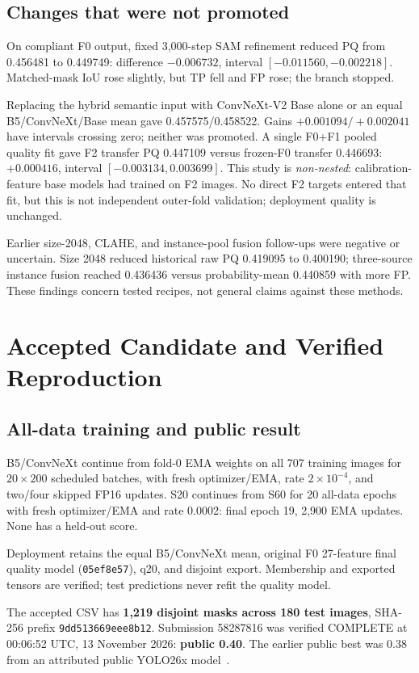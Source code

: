\documentclass[sigconf]{acmart}
\newcommand{\code}[1]{\texttt{\small #1}}
\begin{document}
\subsection{Changes that were not promoted}
On compliant F0 output, fixed 3,000-step SAM refinement reduced PQ from 0.456481 to 0.449749: difference $-0.006732$, interval $[-0.011560,-0.002218]$. Matched-mask IoU rose slightly, but TP fell and FP rose; the branch stopped.

Replacing the hybrid semantic input with ConvNeXt-V2 Base alone or an equal B5/ConvNeXt/Base mean gave 0.457575/0.458522. Gains $+0.001094/+0.002041$ have intervals crossing zero; neither was promoted. A single F0+F1 pooled quality fit gave F2 transfer PQ 0.447109 versus frozen-F0 transfer 0.446693: $+0.000416$, interval $[-0.003134,0.003699]$. This study is \emph{non-nested}: calibration-feature base models had trained on F2 images. No direct F2 targets entered that fit, but this is not independent outer-fold validation; deployment quality is unchanged.

Earlier size-2048, CLAHE, and instance-pool fusion follow-ups were negative or uncertain. Size 2048 reduced historical raw PQ 0.419095 to 0.400190; three-source instance fusion reached 0.436436 versus probability-mean 0.440859 with more FP. These findings concern tested recipes, not general claims against these methods.

\clearpage
\section{Accepted Candidate and Verified Reproduction}
\subsection{All-data training and public result}
B5/ConvNeXt continue from fold-0 EMA weights on all 707 training images for $20\times200$ scheduled batches, with fresh optimizer/EMA, rate $2\times10^{-4}$, and two/four skipped FP16 updates. S20 continues from S60 for 20 all-data epochs with fresh optimizer/EMA and rate 0.0002: final epoch 19, 2,900 EMA updates. None has a held-out score.

Deployment retains the equal B5/ConvNeXt mean, original F0 27-feature final quality model (\code{05ef8e57}), q20, and disjoint export. Membership and exported tensors are verified; test predictions never refit the quality model.

The accepted CSV has \textbf{1,219 disjoint masks across 180 test images}, SHA-256 prefix \code{9dd513669eee8b12}. Submission 58287816 was verified COMPLETE at 00:06:52 UTC, 13 November 2026: \textbf{public 0.40}. The earlier public best was 0.38 from an attributed public YOLO26x model~\cite{hdjojo2026}.
\end{document}
